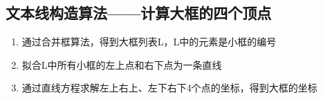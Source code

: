 \documentclass[11pt]{article}
\providecommand{\tightlist}{%
      \setlength{\itemsep}{0pt}\setlength{\parskip}{0pt}}
\begin{document}
    \hypertarget{ux6587ux672cux7ebfux6784ux9020ux7b97ux6cd5ux8ba1ux7b97ux5927ux6846ux7684ux56dbux4e2aux9876ux70b9}{%
\subsection{文本线构造算法------计算大框的四个顶点}\label{ux6587ux672cux7ebfux6784ux9020ux7b97ux6cd5ux8ba1ux7b97ux5927ux6846ux7684ux56dbux4e2aux9876ux70b9}}

    \begin{enumerate}
\def\labelenumi{\arabic{enumi}.}
\tightlist
\item
  通过合并框算法，得到大框列表L，L中的元素是小框的编号
\item
  拟合L中所有小框的左上点和右下点为一条直线
\item
  通过直线方程求解左上右上、左下右下4个点的坐标，得到大框的坐标
\end{enumerate}
\end{document}
